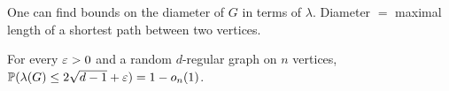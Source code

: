\begin{remark}
    One can find bounds on the diameter of $G$ in terms of $\lambda$. Diameter $=$ maximal length of a shortest path between two vertices.\\ 
\end{remark}
\begin{theorem}[Friedman 2003]\label{9.12}
    For every $\varepsilon>0$ and a random $d$-regular graph on $n$ vertices, $\mathbb{P}(\lambda(G)\leq 2\sqrt{d-1}+\varepsilon)=1-o_n(1)$.
\end{theorem}